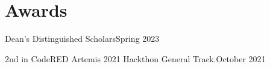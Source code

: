 \section{Awards}
\resumeSubHeadingListStart
    \AwardSubheading
    {Dean’s Distinguished Scholars}{Spring 2023}
    
    \AwardSubheading
    {2nd in CodeRED Artemis 2021 Hackthon General Track.}{October 2021}
\resumeSubHeadingListEnd